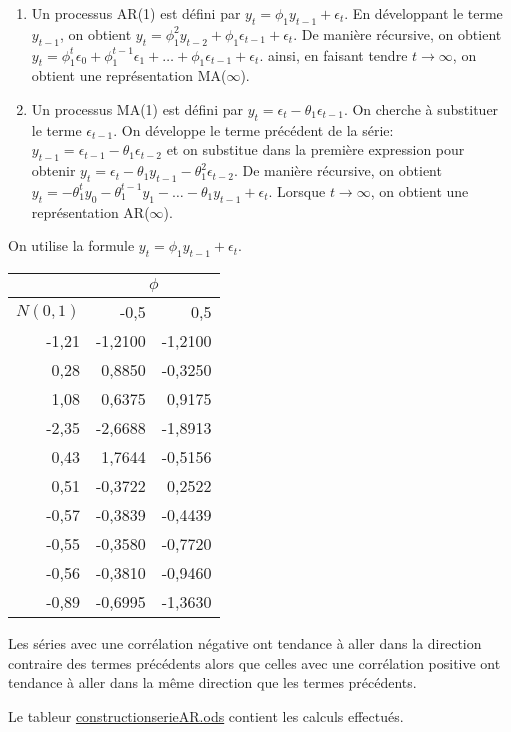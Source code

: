 \begin{solution}{2.3}
  \begin{enumerate}
\item Un processus AR(1) est défini par $y_t = \phi_1y_{t-1} + \epsilon_t$. En développant le terme $y_{t-1}$, on obtient $y_t = \phi_1^2y_{t-2}+\phi_1\epsilon_{t-1}+\epsilon_t$. De manière récursive, on obtient $y_t = \phi_1^{t}\epsilon_0 + \phi_1^{t-1}\epsilon_1 + \ldots + \phi_1\epsilon_{t-1} + \epsilon_t$. ainsi, en faisant tendre $t\to\infty$, on obtient une représentation MA($\infty$).

\item Un processus MA(1) est défini par $y_t = \epsilon_t - \theta_1\epsilon_{t-1}$. On cherche à substituer le terme $\epsilon_{t-1}$. On développe le terme précédent de la série: $y_{t-1} = \epsilon_{t-1} - \theta_1\epsilon_{t-2}$ et on substitue dans la première expression pour obtenir $y_t = \epsilon_t - \theta_1y_{t-1} - \theta_1^2\epsilon_{t-2}$. De manière récursive, on obtient $y_t = -\theta_1^ty_0-\theta_1^{t-1}y_1-\ldots-\theta_1y_{t-1}+\epsilon_{t}$. Lorsque $t\to\infty$, on obtient une représentation AR($\infty$).
\end{enumerate}
\end{solution}
\begin{solution}{2.4}
  On utilise la formule $y_t = \phi_1y_{t-1} + \epsilon_t$.

\begin{center}
\begin{tabular}{|r|r|r|}
\hline
\multicolumn{1}{|l|}{} & \multicolumn{ 2}{c|}{$\phi$} \\ \hline
\multicolumn{1}{|l|}{$N(0,1)$} & -0,5 & 0,5 \\ \hline
-1,21 & -1,2100 & -1,2100 \\ \hline
0,28 & 0,8850 & -0,3250 \\ \hline
1,08 & 0,6375 & 0,9175 \\ \hline
-2,35 & -2,6688 & -1,8913 \\ \hline
0,43 & 1,7644 & -0,5156 \\ \hline
0,51 & -0,3722 & 0,2522 \\ \hline
-0,57 & -0,3839 & -0,4439 \\ \hline
-0,55 & -0,3580 & -0,7720 \\ \hline
-0,56 & -0,3810 & -0,9460 \\ \hline
-0,89 & -0,6995 & -1,3630 \\ \hline
\end{tabular}
\end{center}

Les séries avec une corrélation négative ont tendance à aller dans la direction contraire des termes précédents alors que celles avec une corrélation positive ont tendance à aller dans la même direction que les termes précédents.

Le tableur \url{constructionserieAR.ods} contient les calculs effectués.
\end{solution}
